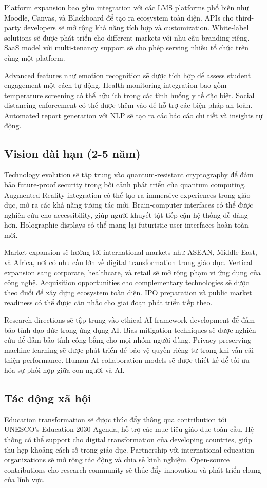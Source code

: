 \documentclass[12pt,a4paper]{report}
\begin{document}
Platform expansion bao gồm integration với các LMS platforms phổ biến như Moodle, Canvas, và Blackboard để tạo ra ecosystem toàn diện. APIs cho third-party developers sẽ mở rộng khả năng tích hợp và customization. White-label solutions sẽ được phát triển cho different markets với nhu cầu branding riêng. SaaS model với multi-tenancy support sẽ cho phép serving nhiều tổ chức trên cùng một platform.

Advanced features như emotion recognition sẽ được tích hợp để assess student engagement một cách tự động. Health monitoring integration bao gồm temperature screening có thể hữu ích trong các tình huống y tế đặc biệt. Social distancing enforcement có thể được thêm vào để hỗ trợ các biện pháp an toàn. Automated report generation với NLP sẽ tạo ra các báo cáo chi tiết và insights tự động.

\subsection{Vision dài hạn (2-5 năm)}
Technology evolution sẽ tập trung vào quantum-resistant cryptography để đảm bảo future-proof security trong bối cảnh phát triển của quantum computing. Augmented Reality integration có thể tạo ra immersive experiences trong giáo dục, mở ra các khả năng tương tác mới. Brain-computer interfaces có thể được nghiên cứu cho accessibility, giúp người khuyết tật tiếp cận hệ thống dễ dàng hơn. Holographic displays có thể mang lại futuristic user interfaces hoàn toàn mới.

Market expansion sẽ hướng tới international markets như ASEAN, Middle East, và Africa, nơi có nhu cầu lớn về digital transformation trong giáo dục. Vertical expansion sang corporate, healthcare, và retail sẽ mở rộng phạm vi ứng dụng của công nghệ. Acquisition opportunities cho complementary technologies sẽ được theo đuổi để xây dựng ecosystem toàn diện. IPO preparation và public market readiness có thể được cân nhắc cho giai đoạn phát triển tiếp theo.

Research directions sẽ tập trung vào ethical AI framework development để đảm bảo tính đạo đức trong ứng dụng AI. Bias mitigation techniques sẽ được nghiên cứu để đảm bảo tính công bằng cho mọi nhóm người dùng. Privacy-preserving machine learning sẽ được phát triển để bảo vệ quyền riêng tư trong khi vẫn cải thiện performance. Human-AI collaboration models sẽ được thiết kế để tối ưu hóa sự phối hợp giữa con người và AI.

\subsection{Tác động xã hội}
Education transformation sẽ được thúc đẩy thông qua contribution tới UNESCO's Education 2030 Agenda, hỗ trợ các mục tiêu giáo dục toàn cầu. Hệ thống có thể support cho digital transformation của developing countries, giúp thu hẹp khoảng cách số trong giáo dục. Partnership với international education organizations sẽ mở rộng tác động và chia sẻ kinh nghiệm. Open-source contributions cho research community sẽ thúc đẩy innovation và phát triển chung của lĩnh vực.
\end{document}
